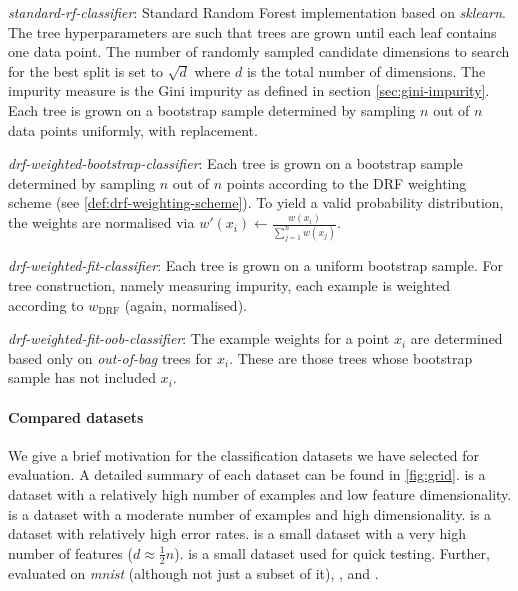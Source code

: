 \documentclass[../main.tex]{subfiles}
\begin{document}
\textit{standard-rf-classifier}: Standard Random Forest implementation based on \textit{sklearn}. The tree hyperparameters are such that trees are grown until each leaf contains one data point. The number of randomly sampled candidate dimensions to search for the best split is set to $\sqrt{d}$ where $d$ is the total number of dimensions. The impurity measure is the Gini impurity as defined in section \ref{sec:gini-impurity}. Each tree is grown on a bootstrap sample determined by sampling $n$ out of $n$ data points uniformly, with replacement.

\textit{drf-weighted-bootstrap-classifier}: Each tree is grown on a bootstrap sample determined by sampling $n$ out of $n$ points according to the DRF weighting scheme (see \ref{def:drf-weighting-scheme}). To yield a valid probability distribution, the weights are normalised via $w'(x_i) \gets \frac{w(x_i)}{\sum_{j=1}^n w(x_j)}$.

\textit{drf-weighted-fit-classifier}: Each tree is grown on a uniform bootstrap sample. For tree construction, namely measuring impurity, each example is weighted according to $w_{\text{DRF}}$ (again, normalised).

\textit{drf-weighted-fit-oob-classifier}: The example weights for a point $x_i$ are determined based only on \textit{out-of-bag} trees for $x_i$. These are those trees whose bootstrap sample has not included $x_i$.

\paragraph{Compared datasets} We give a brief motivation for the classification datasets we have selected for evaluation. A detailed summary of each dataset can be found in \ref{fig:grid}.
\cover is a dataset with a relatively high number of examples and low feature dimensionality. \mnist is a dataset with a moderate number of examples and high dimensionality. \diabetes is a dataset with relatively high error rates. \bioresponse is a small dataset with a very high number of features ($d \approx \frac{1}{2}n$). \qsar is a small dataset used for quick testing.
Further, \cite{bernard, xuChen} evaluated on \textit{mnist} (although not just a subset of it), \spambase, \digits and \diabetes.
\end{document}
